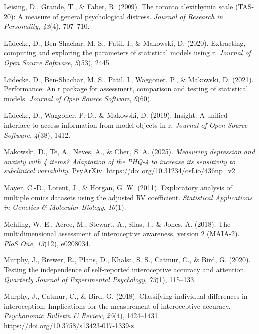 \documentclass[
  jou,
  floatsintext,
  longtable,
  nolmodern,
  notxfonts,
  notimes,
  colorlinks=true,linkcolor=blue,citecolor=blue,urlcolor=blue]{apa7}
\newlength{\cslhangindent}
\newenvironment{CSLReferences}[2] %
 {\begin{list}{}{%
  \setlength{\itemindent}{0pt}
  \setlength{\leftmargin}{0pt}
  \setlength{\parsep}{0pt}
  \ifodd #1
   \setlength{\leftmargin}{\cslhangindent}
   \setlength{\itemindent}{-1\cslhangindent}
  \fi
  \setlength{\itemsep}{#2\baselineskip}}}
 {\end{list}}
\begin{document}
\begin{CSLReferences}{1}{0}
Leising, D., Grande, T., \& Faber, R. (2009). The toronto alexithymia
scale (TAS-20): A measure of general psychological distress.
\emph{Journal of Research in Personality}, \emph{43}(4), 707--710.

Lüdecke, D., Ben-Shachar, M. S., Patil, I., \& Makowski, D. (2020).
Extracting, computing and exploring the parameters of statistical models
using r. \emph{Journal of Open Source Software}, \emph{5}(53), 2445.

Lüdecke, D., Ben-Shachar, M. S., Patil, I., Waggoner, P., \& Makowski,
D. (2021). Performance: An r package for assessment, comparison and
testing of statistical models. \emph{Journal of Open Source Software},
\emph{6}(60).

Lüdecke, D., Waggoner, P. D., \& Makowski, D. (2019). Insight: A unified
interface to access information from model objects in r. \emph{Journal
of Open Source Software}, \emph{4}(38), 1412.

Makowski, D., Te, A., Neves, A., \& Chen, S. A. (2025). \emph{Measuring
depression and anxiety with 4 items? Adaptation of the PHQ-4 to increase
its sensitivity to subclinical variability}. PsyArXiv.
\url{https://doi.org/10.31234/osf.io/436np_v2}

Mayer, C.-D., Lorent, J., \& Horgan, G. W. (2011). Exploratory analysis
of multiple omics datasets using the adjusted RV coefficient.
\emph{Statistical Applications in Genetics \& Molecular Biology},
\emph{10}(1).

Mehling, W. E., Acree, M., Stewart, A., Silas, J., \& Jones, A. (2018).
The multidimensional assessment of interoceptive awareness, version 2
(MAIA-2). \emph{PloS One}, \emph{13}(12), e0208034.

Murphy, J., Brewer, R., Plans, D., Khalsa, S. S., Catmur, C., \& Bird,
G. (2020). Testing the independence of self-reported interoceptive
accuracy and attention. \emph{Quarterly Journal of Experimental
Psychology}, \emph{73}(1), 115--133.

Murphy, J., Catmur, C., \& Bird, G. (2018). Classifying individual
differences in interoception: Implications for the measurement of
interoceptive accuracy. \emph{Psychonomic Bulletin \& Review},
\emph{25}(4), 1424--1431.
\url{https://doi.org/10.3758/s13423-017-1339-z}


\end{CSLReferences}
\end{document}
